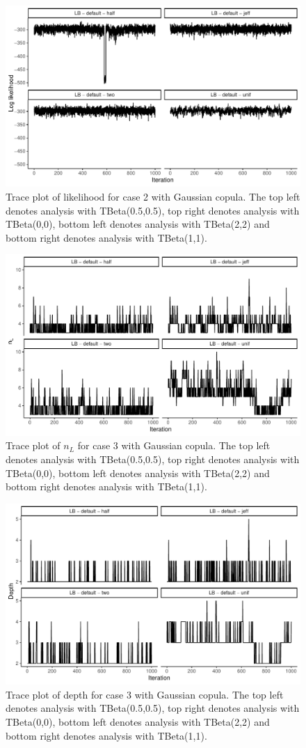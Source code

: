 \documentclass{amsart}
\begin{document}
\begin{figure}
	\centering
	\includegraphics[width = 0.75\linewidth]{trace_case2_gauss_like.pdf}
	\caption{Trace plot of likelihood for case 2 with Gaussian copula. The top left denotes analysis with TBeta(0.5,0.5), top right denotes analysis with TBeta(0,0), bottom left denotes analysis with TBeta(2,2) and bottom right denotes analysis with TBeta(1,1).}
	\label{fig:case2:gauss:like}
\end{figure}

\begin{figure}
	\centering
	\includegraphics[width = 0.75\linewidth]{trace_case3_gauss_nterm.pdf}
	\caption{Trace plot of $n_L$ for case 3 with Gaussian copula. The top left denotes analysis with TBeta(0.5,0.5), top right denotes analysis with TBeta(0,0), bottom left denotes analysis with TBeta(2,2) and bottom right denotes analysis with TBeta(1,1).}
	\label{fig:case3:gauss:nterm}
\end{figure}

\begin{figure}
	\centering
	\includegraphics[width = 0.75\linewidth]{trace_case3_gauss_depth.pdf}
	\caption{Trace plot of depth for case 3 with Gaussian copula. The top left denotes analysis with TBeta(0.5,0.5), top right denotes analysis with TBeta(0,0), bottom left denotes analysis with TBeta(2,2) and bottom right denotes analysis with TBeta(1,1).}
	\label{fig:case3:gauss:depth}
\end{figure}
\end{document}
